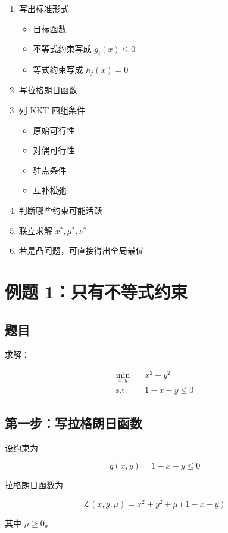 \begin{enumerate}
  \item 写出标准形式

  \begin{itemize}
    \item 目标函数
    \item 不等式约束写成 \(g_i(x)\le 0\)
    \item 等式约束写成 \(h_j(x)=0\)
  \end{itemize}
  \item 写拉格朗日函数
  \item 列 KKT 四组条件

  \begin{itemize}
    \item 原始可行性
    \item 对偶可行性
    \item 驻点条件
    \item 互补松弛
  \end{itemize}
  \item 判断哪些约束可能活跃
  \item 联立求解 \(x^*,\mu^*,\nu^*\)
  \item 若是凸问题，可直接得出全局最优
\end{enumerate}

\section{例题 1：只有不等式约束}

\subsection{题目}

求解：

\[
\begin{aligned}
\min_{x,y}\quad & x^2+y^2\\
\text{s.t.}\quad & 1-x-y\le 0
\end{aligned}
\]

\subsection{第一步：写拉格朗日函数}

设约束为

\[
g(x,y)=1-x-y\le 0
\]

拉格朗日函数为

\[
\mathcal{L}(x,y,\mu)=x^2+y^2+\mu(1-x-y)
\]

其中 \(\mu\ge 0\)。


